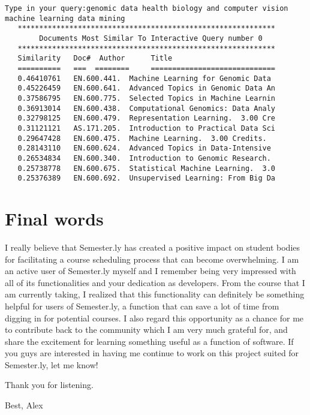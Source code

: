 \documentclass[twoside]{article}
\begin{document}
\begin{verbatim}
Type in your query:genomic data health biology and computer vision machine learning data mining
   ************************************************************
        Documents Most Similar To Interactive Query number 0       
   ************************************************************
   Similarity   Doc#  Author      Title                        
   ==========   ===  ========     =============================
   0.46410761   EN.600.441.  Machine Learning for Genomic Data 
   0.45226459   EN.600.641.  Advanced Topics in Genomic Data An
   0.37586795   EN.600.775.  Selected Topics in Machine Learnin
   0.36913014   EN.600.438.  Computational Genomics: Data Analy
   0.32798125   EN.600.479.  Representation Learning.  3.00 Cre
   0.31121121   AS.171.205.  Introduction to Practical Data Sci
   0.29647428   EN.600.475.  Machine Learning.  3.00 Credits.
   0.28143110   EN.600.624.  Advanced Topics in Data-Intensive 
   0.26534834   EN.600.340.  Introduction to Genomic Research. 
   0.25738778   EN.600.675.  Statistical Machine Learning.  3.0
   0.25376389   EN.600.692.  Unsupervised Learning: From Big Da

\end{verbatim}


\section{Final words}

I really believe that Semester.ly has created a positive impact on student bodies for facilitating a course scheduling process that can become overwhelming. I am an active user of Semester.ly myself and I remember being very impressed with all of its functionalities and your dedication as developers. From the course that I am currently taking, I realized that this functionality can definitely be something helpful for users of Semester.ly, a function that can save a lot of time from digging in for potential courses. I also regard this opportunity as a chance for me to contribute back to the community which I am very much grateful for, and share the excitement for learning something useful as a function of software. If you guys are interested in having me continue to work on this project suited for Semester.ly, let me know!

Thank you for listening.

Best,
Alex
\end{document}
